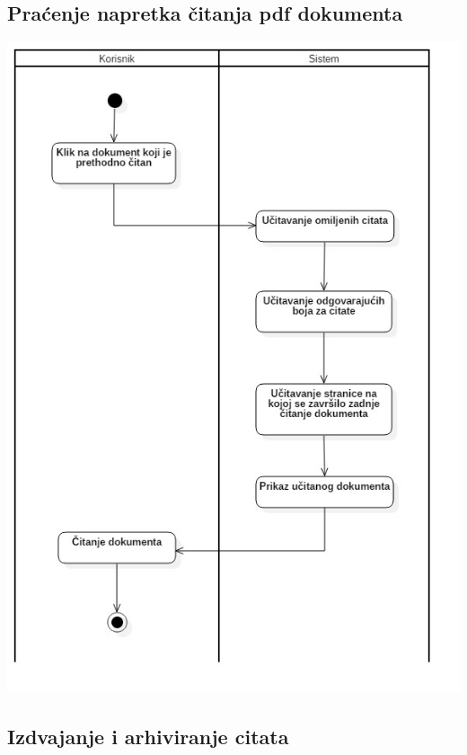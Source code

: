 \subsection{Praćenje napretka čitanja pdf dokumenta}

\begin{center}
    \includegraphics[scale=0.4]{images/PracenjeNapretkaCitanjaPdfFajla.png}
\end{center}

\subsection{Izdvajanje i arhiviranje citata}

